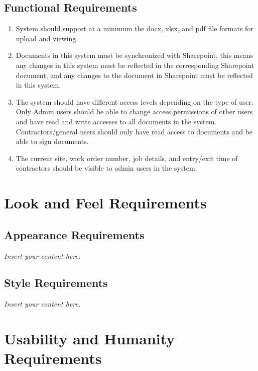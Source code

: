 \documentclass[12pt]{article}
\newcommand{\lips}{\textit{Insert your content here.}}
\begin{document}
\subsection{Functional Requirements}
\begin{enumerate} [{FR}1.]
  \item System should support at a minimum the docx, xlsx, and pdf file formats for
        upload and viewing.
  \item Documents in this system must be synchronized with Sharepoint, this means any
        changes in this system must be reflected in the corresponding Sharepoint
        document, and any changes to the document in Sharepoint must be reflected in
        this system.
  \item The system should have different access levels depending on the type of user.
        Only Admin users should be able to change access permissions of other users and
        have read and write accesses to all documents in the system.
        Contractors/general users should only have read access to documents and be able
        to sign documents.
  \item The current site, work order number, job details, and entry/exit time of 
        contractors should be visible to admin users in the system.
\end{enumerate}

\section{Look and Feel Requirements}
\subsection{Appearance Requirements}
\lips
\subsection{Style Requirements}
\lips

\section{Usability and Humanity Requirements}
\end{document}
